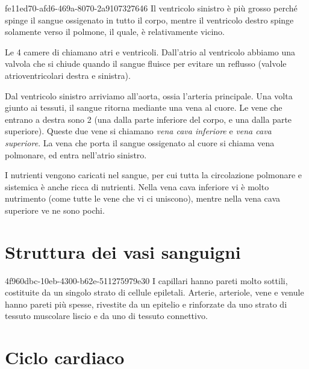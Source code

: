 \documentclass[preview]{standalone}
\begin{document}
\begin{snippet}{fe11ed70-afd6-469a-8070-2a9107327646}
    Il ventricolo sinistro è più grosso perché spinge il sangue ossigenato in tutto il corpo,
    mentre il ventricolo destro spinge solamente verso il polmone, il quale, è relativamente vicino.
    
    Le 4 camere di chiamano atri e ventricoli.
    Dall'atrio al ventricolo abbiamo una valvola che si chiude quando il sangue fluisce
    per evitare un reflusso (valvole atrioventricolari destra e sinistra).
    
    Dal ventricolo sinistro arriviamo all'aorta, ossia l'arteria principale.
    Una volta giunto ai tessuti, il sangue ritorna mediante una vena al cuore.
    Le vene che entrano a destra sono 2 (una dalla parte inferiore del corpo, e una dalla parte superiore).
    Queste due vene si chiamano \textit{vena cava inferiore} e \textit{vena cava superiore}.
    La vena che porta il sangue ossigenato al cuore si chiama vena polmonare, ed entra nell'atrio sinistro.
    
    
    I nutrienti vengono caricati nel sangue, per cui tutta la circolazione polmonare e sistemica
    è anche ricca di nutrienti. Nella vena cava inferiore vi è molto nutrimento
    (come tutte le vene che vi ci uniscono), mentre nella vena cava superiore ve ne sono pochi.

\end{snippet}

\section{Struttura dei vasi sanguigni}

\begin{snippet}{4f960dbc-10eb-4300-b62e-511275979e30}
    I capillari hanno pareti molto sottili, costituite da un singolo strato di cellule epiletali.
    Arterie, arteriole, vene e venule hanno pareti più spesse, rivestite da un epitelio e rinforzate da uno strato di tessuto muscolare liscio e da uno di tessuto connettivo.
\end{snippet}


\section{Ciclo cardiaco}
\end{document}
